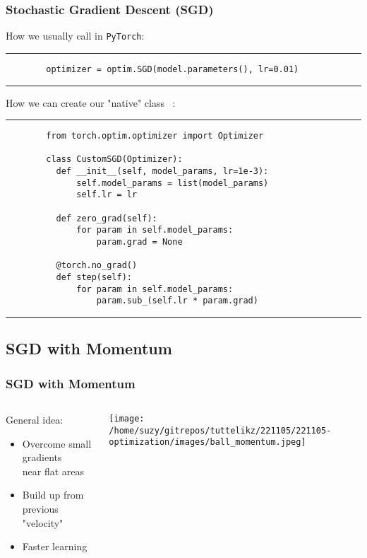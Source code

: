     \begin{frame}[fragile]
      \frametitle{Stochastic Gradient Descent (SGD)}
      \vspace{0.2cm}
      How we usually call in \verb|PyTorch|:
      \rule{\textwidth}{1pt}
      \scriptsize
      \begin{verbatim}
        optimizer = optim.SGD(model.parameters(), lr=0.01)
      \end{verbatim}
      \rule{\textwidth}{1pt}
      
      \normalsize
      \vspace{0.2cm}
      How we can create our "native" class ~\cite{Novik_torchoptimizers}:
      \rule{\textwidth}{1pt}
      \scriptsize
      \begin{verbatim}
        from torch.optim.optimizer import Optimizer
        
        class CustomSGD(Optimizer):
          def __init__(self, model_params, lr=1e-3):
              self.model_params = list(model_params)
              self.lr = lr

          def zero_grad(self):
              for param in self.model_params:
                  param.grad = None

          @torch.no_grad()
          def step(self):
              for param in self.model_params:
                  param.sub_(self.lr * param.grad)
      \end{verbatim}
      \rule{\textwidth}{1pt}
    \end{frame}


    \subsection{SGD with Momentum}
    \begin{frame}
      \frametitle{SGD with Momentum} %
      
      \begin{columns}
          \begin{column}{0.5\textwidth}
            General idea:
            \begin{itemize}
              \item Overcome small gradients \\ near flat areas
              \item Build up from previous "velocity"
              \item Faster learning
            \end{itemize}
          \end{column}
          \begin{column}{0.5\textwidth}  %
              \begin{center}
                \texttt{[image: /home/suzy/gitrepos/tuttelikz/221105/221105-optimization/images/ball\_momentum.jpeg]}
              \end{center}
          \end{column}
      \end{columns}
    \end{frame}



